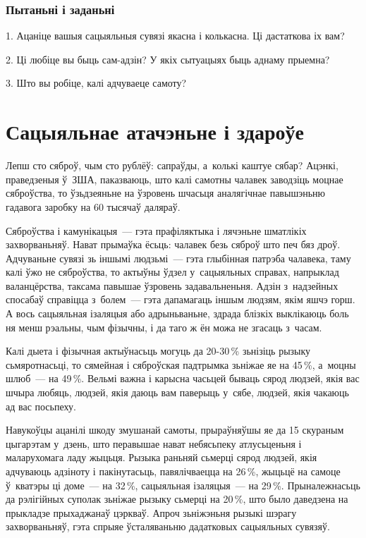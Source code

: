 \subsubsection{Пытаньні і заданьні}

1. Ацаніце вашыя сацыяльныя сувязі якасна і колькасна. Ці дастаткова іх вам?

2. Ці любіце вы быць сам-адзін? У якіх сытуацыях быць аднаму прыемна?

3. Што вы робіце, калі адчуваеце самоту?


\section{Сацыяльнае атачэньне і здароўе}

Лепш сто сяброў, чым сто рублёў: сапраўды, а~колькі каштуе сябар? Ацэнкі, праведзеныя ў~ЗША, паказваюць, што калі самотны чалавек заводзіць моцнае сяброўства, то ўзьдзеяньне на ўзровень шчасьця аналягічнае павышэньню гадавога заробку на 60 тысячаў даляраў.

Сяброўства і камунікацыя~--- гэта прафіляктыка і лячэньне шматлікіх захворваньняў. Нават прымаўка ёсьць: чалавек безь сяброў што печ бяз дроў. Адчуваньне сувязі зь іншымі людзьмі~--- гэта глыбінная патрэба чалавека, таму калі ўжо не сяброўства, то актыўны ўдзел у~сацыяльных справах, напрыклад валанцёрства, таксама павышае ўзровень задавальненьня. Адзін з~надзейных спосабаў справіцца з~болем~--- гэта дапамагаць іншым людзям, якім яшчэ горш. А вось сацыяльная ізаляцыя або адрыньваньне, здрада блізкіх выклікаюць боль ня менш рэальны, чым фізычны, і да таго ж ён можа не згасаць з~часам.

Калі дыета і фізычная актыўнасьць могуць да 20-30\,\% зьнізіць рызыку сьмяротнасьці, то сямейная і сяброўская падтрымка зьніжае яе на 45\,\%, а~моцны шлюб~--- на 49\,\%. Вельмі важна і карысна часьцей бываць сярод людзей, якія вас шчыра любяць, людзей, якія даюць вам паверыць у~сябе, людзей, якія чакаюць ад вас посьпеху.

Навукоўцы ацанілі шкоду змушанай самоты, прыраўняўшы яе да 15 скураным цыгарэтам у~дзень, што перавышае нават небясьпеку атлусьценьня і маларухомага ладу жыцьця. Рызыка раньняй сьмерці сярод людзей, якія адчуваюць адзіноту і пакінутасьць, павялічваецца на 26\,\%, жыцьцё на самоце ў~кватэры ці доме~--- на 32\,\%, сацыяльная ізаляцыя~--- на 29\,\%. Прыналежнасьць да рэлігійных суполак зьніжае рызыку сьмерці на 20\,\%, што было даведзена на прыкладзе прыхаджанаў цэркваў. Апроч зьніжэньня рызыкі шэрагу захворваньняў, гэта спрыяе ўсталяваньню дадатковых сацыяльных сувязяў.


